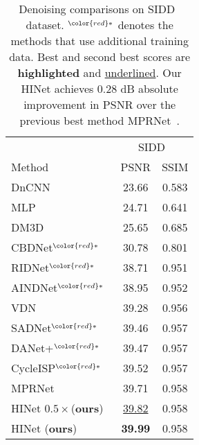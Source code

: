 \documentclass[final]{cvpr}
\newcommand{\tablestyle}[2]{\setlength{\tabcolsep}{#1}\renewcommand{\arraystretch}{#2}\centering\footnotesize}
\begin{document}
\begin{table}
\centering
\tablestyle{5pt}{1.05}\setlength{\tabcolsep}{1.mm}\begin{tabular}{l|cc}
& \multicolumn{2}{|c}{SIDD~\cite{abdelhamed2018high}}\\
Method & PSNR & SSIM\\ 
\hline
DnCNN~\cite{zhang2017beyond}&23.66&0.583\\
MLP~\cite{burger2012image}&24.71&0.641\\
DM3D~\cite{dabov2007image}&25.65&0.685\\
CBDNet$^{\color{red}*}$~\cite{guo2019toward}&30.78&0.801\\
RIDNet$^{\color{red}*}$~\cite{anwar2019real}&38.71&0.951\\
AINDNet$^{\color{red}*}$~\cite{kim2020transfer}&38.95&0.952\\
VDN~\cite{yue2019variational}&39.28&0.956\\
SADNet$^{\color{red}*}$~\cite{chang2020spatial}&39.46&0.957\\
DANet+$^{\color{red}*}$~\cite{yue2020dual}&39.47&0.957\\
CycleISP$^{\color{red}*}$~\cite{Zamir2020CycleISP}&39.52&0.957\\
MPRNet~\cite{Zamir2021MPRNet}&39.71&0.958\\
\hline
HINet $0.5\times$(\textbf{ours})&\underline{39.82}&0.958\\
HINet (\textbf{ours})&\textbf{39.99}&0.958\\
\end{tabular}
\vspace{-0.2cm}
\caption{Denoising comparisons on SIDD~\cite{abdelhamed2018high} dataset. $^{\color{red}*}$ denotes the methods that use additional training data. Best and second best scores are \textbf{highlighted} and \underline{underlined}. Our HINet achieves 0.28 dB absolute improvement in PSNR over the previous best method MPRNet~\cite{Zamir2021MPRNet}.}
\label{tab.SIDD.results}
\vspace{-0.2cm}
\end{table}
\end{document}
